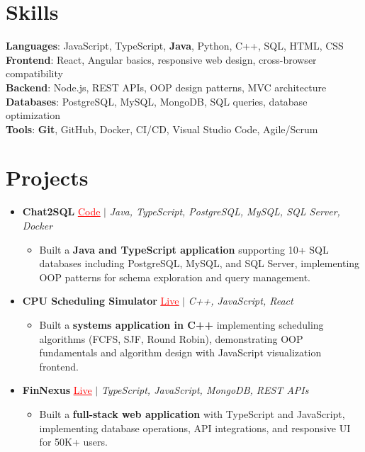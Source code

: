 \documentclass[letterpaper,10pt]{article}
\newcommand{\resumeItem}[1]{\item\small{{#1 \vspace{-2pt}}}}
\newcommand{\resumeProjectHeading}[1]{\item \small #1 \vspace{-2pt}}
\newcommand{\resumeSubHeadingListStart}{\begin{itemize}[leftmargin=0.0in, label={}]}
\newcommand{\resumeSubHeadingListEnd}{\end{itemize}}
\newcommand{\resumeProjItemListStart}{\begin{itemize}[leftmargin=0.15in,label=\textbullet,itemsep=0pt,topsep=0pt,parsep=0pt,partopsep=0pt]}
\newcommand{\resumeProjItemListEnd}{\end{itemize}\vspace{-4pt}}
\begin{document}
\section{Skills}
\begin{itemize}[leftmargin=0.15in, label={}]
\small{\item{
\textbf{Languages}: JavaScript, TypeScript, \textbf{Java}, Python, C++, SQL, HTML, CSS \\
\textbf{Frontend}: React, Angular basics, responsive web design, cross-browser compatibility \\
\textbf{Backend}: Node.js, REST APIs, OOP design patterns, MVC architecture \\
\textbf{Databases}: PostgreSQL, MySQL, MongoDB, SQL queries, database optimization \\
\textbf{Tools}: \textbf{Git}, GitHub, Docker, CI/CD, Visual Studio Code, Agile/Scrum
}}
\end{itemize}
\vspace{-16pt}
\section{Projects}
\resumeSubHeadingListStart
\vspace{-2pt}
\resumeProjectHeading{\textbf{Chat2SQL} {\href{https://github.com/SAHAJ-BHADJA/Chat2SQL}{\textcolor{red}{\underline{Code}}}} $|$ \emph{Java, TypeScript, PostgreSQL, MySQL, SQL Server, Docker}}
\resumeProjItemListStart
\resumeItem{Built a \textbf{Java and TypeScript application} supporting 10+ SQL databases including PostgreSQL, MySQL, and SQL Server, implementing OOP patterns for schema exploration and query management.}
\resumeProjItemListEnd
\vspace{3pt}
\resumeProjectHeading{\textbf{CPU Scheduling Simulator} {\href{https://cpu-scheduler-amber.vercel.app/}{\textcolor{red}{\underline{Live}}}} $|$ \emph{C++, JavaScript, React}}
\resumeProjItemListStart
\resumeItem{Built a \textbf{systems application in C++} implementing scheduling algorithms (FCFS, SJF, Round Robin), demonstrating OOP fundamentals and algorithm design with JavaScript visualization frontend.}
\resumeProjItemListEnd
\vspace{3pt}
\resumeProjectHeading{\textbf{FinNexus} {\href{https://fin-nexus.vercel.app/}{\textcolor{red}{\underline{Live}}}} $|$ \emph{TypeScript, JavaScript, MongoDB, REST APIs}}
\resumeProjItemListStart
\resumeItem{Built a \textbf{full-stack web application} with TypeScript and JavaScript, implementing database operations, API integrations, and responsive UI for 50K+ users.}
\resumeProjItemListEnd
\resumeSubHeadingListEnd
\end{document}
